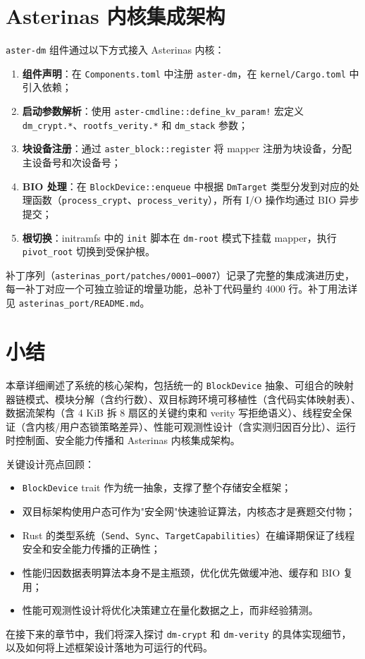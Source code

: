 \section{Asterinas 内核集成架构}

\texttt{aster-dm} 组件通过以下方式接入 Asterinas 内核：

\begin{enumerate}
    \item \textbf{组件声明}：在 \texttt{Components.toml} 中注册 \texttt{aster-dm}，在 \texttt{kernel/Cargo.toml} 中引入依赖；
    \item \textbf{启动参数解析}：使用 \texttt{aster-cmdline::define\_kv\_param!} 宏定义 \texttt{dm\_crypt.*}、\texttt{rootfs\_verity.*} 和 \texttt{dm\_stack} 参数；
    \item \textbf{块设备注册}：通过 \texttt{aster\_block::register} 将 mapper 注册为块设备，分配主设备号和次设备号；
    \item \textbf{BIO 处理}：在 \texttt{BlockDevice::enqueue} 中根据 \texttt{DmTarget} 类型分发到对应的处理函数（\texttt{process\_crypt}、\texttt{process\_verity}），所有 I/O 操作均通过 BIO 异步提交；
    \item \textbf{根切换}：initramfs 中的 \texttt{init} 脚本在 \texttt{dm-root} 模式下挂载 mapper，执行 \texttt{pivot\_root} 切换到受保护根。
\end{enumerate}

补丁序列（\texttt{asterinas\_port/patches/0001--0007}）记录了完整的集成演进历史，每一补丁对应一个可独立验证的增量功能，总补丁代码量约 4000 行。补丁用法详见 \texttt{asterinas\_port/README.md}。

\section{小结}

本章详细阐述了系统的核心架构，包括统一的 \texttt{BlockDevice} 抽象、可组合的映射器链模式、模块分解（含约行数）、双目标跨环境可移植性（含代码实体映射表）、数据流架构（含 4 KiB 拆 8 扇区的关键约束和 verity 写拒绝语义）、线程安全保证（含内核/用户态锁策略差异）、性能可观测性设计（含实测归因百分比）、运行时控制面、安全能力传播和 Asterinas 内核集成架构。

关键设计亮点回顾：
\begin{itemize}
    \item \texttt{BlockDevice} trait 作为统一抽象，支撑了整个存储安全框架；
    \item 双目标架构使用户态可作为"安全网"快速验证算法，内核态才是赛题交付物；
    \item Rust 的类型系统（\texttt{Send}、\texttt{Sync}、\texttt{TargetCapabilities}）在编译期保证了线程安全和安全能力传播的正确性；
    \item 性能归因数据表明算法本身不是主瓶颈，优化优先做缓冲池、缓存和 BIO 复用；
    \item 性能可观测性设计将优化决策建立在量化数据之上，而非经验猜测。
\end{itemize}

在接下来的章节中，我们将深入探讨 \texttt{dm-crypt} 和 \texttt{dm-verity} 的具体实现细节，以及如何将上述框架设计落地为可运行的代码。
